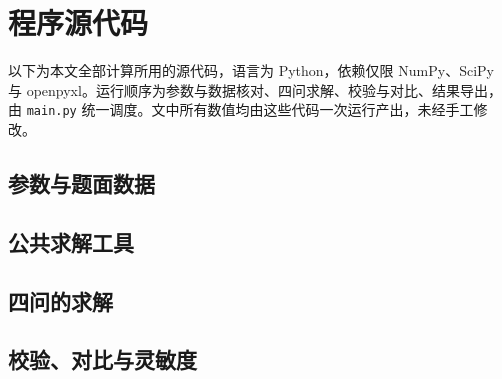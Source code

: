 \section{程序源代码}\label{app:code}

以下为本文全部计算所用的源代码，语言为 Python，依赖仅限 NumPy、SciPy 与 openpyxl。运行顺序为参数与数据核对、四问求解、校验与对比、结果导出，由 \texttt{main.py} 统一调度。文中所有数值均由这些代码一次运行产出，未经手工修改。

\subsection{参数与题面数据}







\subsection{公共求解工具}



\subsection{四问的求解}









\subsection{校验、对比与灵敏度}



